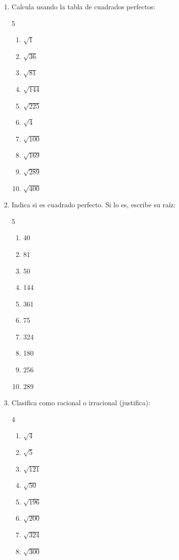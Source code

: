 \documentclass[11pt, letterpaper]{article}
\begin{document}
\begin{enumerate}[label=\textbf{\arabic*.}, leftmargin=*]
  \item Calcula usando la tabla de cuadrados perfectos:
  \begin{multicols}{5}
  \begin{enumerate}[label=\alph*)]
    \item $\sqrt{1}$
    \item $\sqrt{36}$
    \item $\sqrt{81}$
    \item $\sqrt{144}$
    \item $\sqrt{225}$
    \item $\sqrt{4}$
    \item $\sqrt{100}$
    \item $\sqrt{169}$
    \item $\sqrt{289}$
    \item $\sqrt{400}$
  \end{enumerate}
  \end{multicols}

  \item Indica si es cuadrado perfecto. Si lo es, escribe su raíz:
  \begin{multicols}{5}
  \begin{enumerate}[label=\alph*)]
    \item 40
    \item 81
    \item 50
    \item 144
    \item 361
    \item 75
    \item 324
    \item 180
    \item 256
    \item 289
  \end{enumerate}
  \end{multicols}

  \item Clasifica como racional o irracional (justifica):
  \begin{multicols}{4}
  \begin{enumerate}[label=\alph*)]
    \item $\sqrt{4}$
    \item $\sqrt{5}$
    \item $\sqrt{121}$
    \item $\sqrt{50}$
    \item $\sqrt{196}$
    \item $\sqrt{200}$
    \item $\sqrt{324}$
    \item $\sqrt{300}$
  \end{enumerate}
  \end{multicols}
\end{enumerate}
\end{document}
